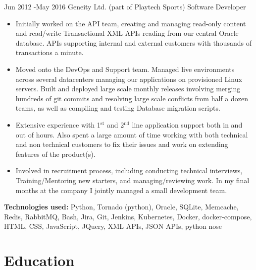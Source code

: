 \documentclass[10pt]{article} %
\begin{document}
\jobheader
{Jun 2012 -}{May 2016}
{Geneity Ltd. (part of Playtech Sports)}
{Software Developer}
\vspace{-1cm}
  \begin{itemize}

  \item Initially worked on the API team, creating and managing read-only content
        and read/write Transactional XML APIs reading from our central Oracle database.
        APIs supporting internal and external customers with thousands of transactions
        a minute.

  \item Moved onto the DevOps and Support team. Managed live environments across
        several datacenters managing our applications on provisioned Linux servers.
        Built and deployed large scale monthly releases involving merging hundreds
        of git commits and resolving large scale conflicts from half a dozen teams,
        as well as compiling and testing Database migration scripts.

  \item Extensive experience with 1$^{\textrm{st}}$ and 2$^{\textrm{nd}}$ line application
        support both in and out of hours. Also spent a large amount of time working
        with both technical and non technical customers to fix their issues and
        work on extending features of the product(s).

  \item Involved in recruitment process, including conducting technical interviews,
        Training/Mentoring new starters, and managing/reviewing work. In my final
        months at the company I jointly managed a small development team.

  \end{itemize}

  \textbf{Technologies used:}
  Python, Tornado (python),
  Oracle, SQLite,
  Memcache, Redis,
  RabbitMQ,
  Bash,
  Jira, Git, Jenkins,
  Kubernetes, Docker, docker-compose,
  HTML, CSS, JavaScript, JQuery,
  XML APIs, JSON APIs,
  python nose



\section{Education}
\end{document}
